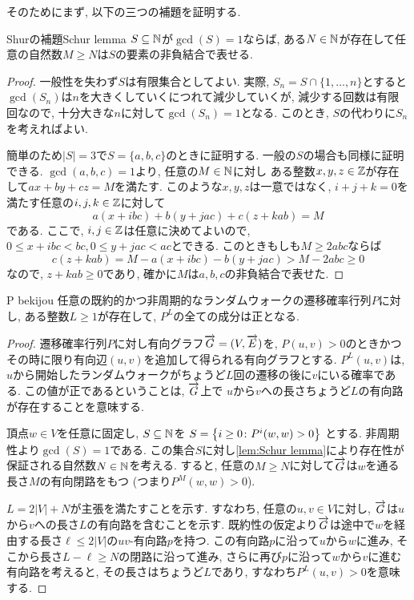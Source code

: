 そのためにまず, 以下の三つの補題を証明する.
\begin{lemma}{Shurの補題}{Schur lemma}
  $S\subseteq \Nat$が$\gcd(S)=1$ならば, ある$N\in\Nat$が存在して任意の自然数$M\ge N$は$S$の要素の非負結合で表せる.
\end{lemma}
\begin{proof}
  一般性を失わず$S$は有限集合としてよい.
  実際, $S_n = S \cap \{1,\dots,n\}$とすると$\gcd(S_n)$は$n$を大きくしていくにつれて減少していくが, 減少する回数は有限回なので, 十分大きな$n$に対して$\gcd(S_n)=1$となる.
  このとき, $S$の代わりに$S_n$を考えればよい.

  簡単のため$|S|=3$で$S=\{a,b,c\}$のときに証明する.
  一般の$S$の場合も同様に証明できる.
  $\gcd(a,b,c)=1$より,
  任意の$M\in\Nat$に対し
  ある整数$x,y,z\in \Int$が存在して$ax+by+cz=M$を満たす.
  このような$x,y,z$は一意ではなく,
  $i+j+k=0$を満たす任意の$i,j,k\in\Int$に対して
  \[
    a(x+ibc) + b(y+jac) + c(z+kab) = M
  \]
  である.
  ここで, $i,j\in\Int$は任意に決めてよいので, $0\le x+ibc < bc, 0\le y+jac < ac$とできる.
  このときもしも$M\ge 2abc$ならば
  \[
    c(z+kab) = M - a(x+ibc) - b(y+jac) > M - 2abc \ge 0
  \]
  なので, $z+kab \ge 0$であり, 確かに$M$は$a,b,c$の非負結合で表せた.
\end{proof}
\begin{lemma}{}{P bekijou}
  任意の既約的かつ非周期的なランダムウォークの遷移確率行列$P$に対し, ある整数$L \ge 1$が存在して, $P^L$の全ての成分は正となる.
\end{lemma}
\begin{proof}
  遷移確率行列$P$に対し有向グラフ$\vG=(V,\vec{E})$を,
  $P(u,v)>0$のときかつその時に限り有向辺$(u,v)$を追加して得られる有向グラフとする.
  $P^L(u,v)$は, $u$から開始したランダムウォークがちょうど$L$回の遷移の後に$v$にいる確率である.
  この値が正であるということは, $\vG$上で
  $u$から$v$への長さちょうど$L$の有向路が存在することを意味する.

  頂点$w\in V$を任意に固定し, $S\subseteq \Nat$を
  $S = \cbra*{i\ge 0\colon P^i(w,w)>0}$
  とする.
  非周期性より$\gcd(S)=1$である.
  この集合$S$に対し\cref{lem:Schur lemma}により存在性が保証される自然数$N\in\Nat$を考える.
  すると, 任意の$M\ge N$に対して$\vG$は$w$を通る長さ$M$の有向閉路をもつ (つまり$P^M(w,w)>0$).
  
  $L=2|V|+N$が主張を満たすことを示す.
  すなわち, 任意の$u,v\in V$に対し, $\vG$は$u$から$v$への長さ$L$の有向路を含むことを示す.
  既約性の仮定より$\vG$は途中で$w$を経由する長さ$\ell \le 2|V|$の$uv$-有向路$p$を持つ.
  この有向路$p$に沿って$u$から$w$に進み, そこから長さ$L - \ell \ge N$の閉路に沿って進み, さらに再び$p$に沿って$w$から$v$に進む有向路を考えると, その長さはちょうど$L$であり, すなわち$P^L(u,v)>0$を意味する.
\end{proof}
